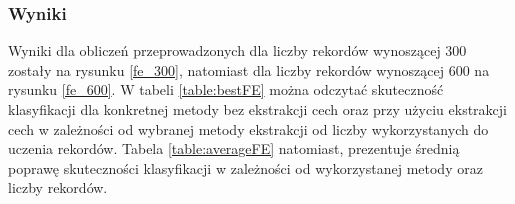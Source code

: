 \subsubsection{Wyniki}
Wyniki dla obliczeń przeprowadzonych dla liczby rekordów wynoszącej 300 zostały na rysunku \ref{fe_300}, natomiast dla liczby rekordów wynoszącej 600 na rysunku \ref{fe_600}. W tabeli \ref{table:bestFE} można odczytać skuteczność klasyfikacji dla konkretnej metody bez ekstrakcji cech oraz przy użyciu ekstrakcji cech w zależności od wybranej metody ekstrakcji od liczby wykorzystanych do uczenia rekordów. Tabela \ref{table:averageFE} natomiast, prezentuje średnią poprawę skuteczności klasyfikacji w zależności od wykorzystanej metody oraz liczby rekordów.


